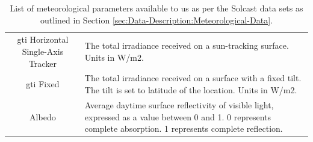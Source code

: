 \begin{table}[H]
\begin{adjustwidth*}{-3.0cm}{-3.0cm}
\begin{tabularx}{\linewidth}{cX}
                        \gls{gti} Horizontal Single-Axis Tracker & The total irradiance received on a sun-tracking surface.  Units in W/m2.                                                                                                                                                                                  \\
                        \gls{gti} Fixed                          & The total irradiance received on a surface with a fixed tilt. The tilt is set to latitude of the location.  Units in W/m2.                                                                                                                                \\
                        Albedo                                   & Average daytime surface reflectivity of visible light, expressed as a value between 0 and 1. 0 represents complete absorption. 1 represents complete reflection.                                                                                          \\
                \end{tabularx}
                \caption{List of meteorological parameters available to us as per the Solcast data sets as outlined in Section \ref{sec:Data-Description:Meteorological-Data}.}
                \label{tab:Solcast-parameters}
        \end{adjustwidth*}
\end{table}
